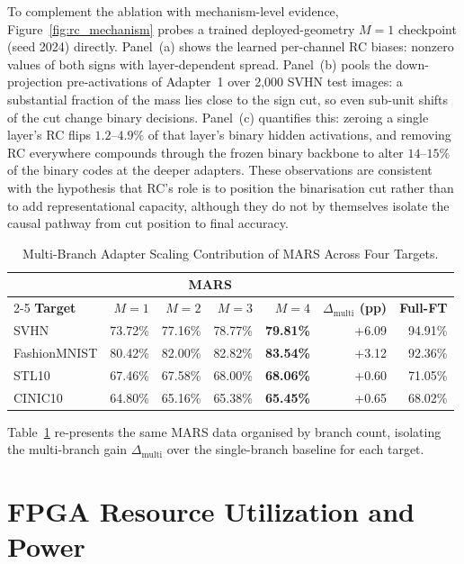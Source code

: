 \documentclass[12pt, a4paper]{report}
\numberwithin{equation}{chapter}
\numberwithin{figure}{chapter}
\numberwithin{table}{chapter}
\numberwithin{algorithm}{chapter}
\begin{document}
To complement the ablation with mechanism-level evidence, Figure~\ref{fig:rc_mechanism} probes a trained deployed-geometry $M{=}1$ checkpoint (seed 2024) directly. Panel~(a) shows the learned per-channel RC biases: nonzero values of both signs with layer-dependent spread. Panel~(b) pools the down-projection pre-activations of Adapter~1 over 2,000 SVHN test images: a substantial fraction of the mass lies close to the sign cut, so even sub-unit shifts of the cut change binary decisions. Panel~(c) quantifies this: zeroing a single layer's RC flips $1.2$--$4.9\%$ of that layer's binary hidden activations, and removing RC everywhere compounds through the frozen binary backbone to alter $14$--$15\%$ of the binary codes at the deeper adapters. These observations are consistent with the hypothesis that RC's role is to position the binarisation cut rather than to add representational capacity, although they do not by themselves isolate the causal pathway from cut position to final accuracy.

\begin{table}[H]
\centering
\caption{Multi-Branch Adapter Scaling Contribution of MARS Across Four Targets.}
\label{tab:multi_adapter_contrib}
\begin{tabular}{lrrrrrr}
\toprule
 & \multicolumn{4}{c}{\textbf{MARS}} & & \\
\cmidrule(lr){2-5}
\textbf{Target} & \textbf{$M{=}1$} & \textbf{$M{=}2$} & \textbf{$M{=}3$} & \textbf{$M{=}4$} & \textbf{$\Delta_{\text{multi}}$ (pp)} & \textbf{Full-FT} \\
\midrule
SVHN         & 73.72\% & 77.16\% & 78.77\% & \textbf{79.81\%} & +6.09 & 94.91\% \\
FashionMNIST & 80.42\% & 82.00\% & 82.82\% & \textbf{83.54\%} & +3.12 & 92.36\% \\
STL10        & 67.46\% & 67.58\% & 68.00\% & \textbf{68.06\%} & +0.60 & 71.05\% \\
CINIC10      & 64.80\% & 65.16\% & 65.38\% & \textbf{65.45\%} & +0.65 & 68.02\% \\
\bottomrule
\end{tabular}
\end{table}

Table~\ref{tab:multi_adapter_contrib} re-presents the same MARS data organised by branch count, isolating the multi-branch gain $\Delta_{\text{multi}}$ over the single-branch baseline for each target.

\section{FPGA Resource Utilization and Power}
\label{sec:hw_results}
\end{document}
